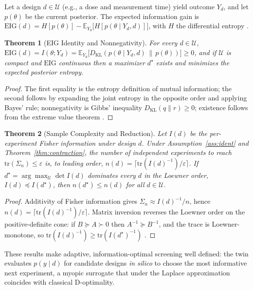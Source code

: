 \documentclass[journal]{IEEEtran}
\newtheorem{theorem}{Theorem}
\newcommand{\E}{\mathbb{E}}
\newcommand{\KL}{D_{\mathrm{KL}}}
\begin{document}
Let a design $d\in\mathcal{U}$ (e.g., a dose and measurement time) yield outcome
$Y_d$, and let $p(\theta)$ be the current posterior. The expected information gain
is $\mathrm{EIG}(d)=H[p(\theta)]-\E_{Y_d}\!\big[H[p(\theta\mid Y_d,d)]\big]$, with
$H$ the differential entropy \cite{cover2006,lindley1956}.

\begin{theorem}[EIG Identity and Nonnegativity]
\label{thm:eig}
For every $d\in\mathcal{U}$,
$\mathrm{EIG}(d)=I(\theta;Y_d)=\E_{Y_d}\big[\KL(p(\theta\mid Y_d,d)\,\|\,p(\theta))\big]\ge0$,
and if $\mathcal{U}$ is compact and $\mathrm{EIG}$ continuous then a maximizer
$d^\star$ exists and minimizes the expected posterior entropy.
\end{theorem}
\begin{proof}
The first equality is the entropy definition of mutual information; the second
follows by expanding the joint entropy in the opposite order and applying Bayes'
rule; nonnegativity is Gibbs' inequality $\KL(q\|r)\ge0$; existence follows from
the extreme value theorem \cite{chaloner1995}.
\end{proof}

\begin{theorem}[Sample Complexity and Reduction]
\label{thm:reduction}
Let $I(d)$ be the per-experiment Fisher information under design $d$. Under
Assumption~\ref{ass:ident} and Theorem~\ref{thm:contraction}, the number of
independent experiments to reach $\mathrm{tr}(\Sigma_n)\le\varepsilon$ is, to
leading order, $n(d)=\lceil\mathrm{tr}(I(d)^{-1})/\varepsilon\rceil$. If
$d^\star=\arg\max_{\mathcal U}\det I(d)$ dominates every $d$ in the Loewner order,
$I(d)\preceq I(d^\star)$, then $n(d^\star)\le n(d)$ for all $d\in\mathcal U$.
\end{theorem}
\begin{proof}
Additivity of Fisher information gives $\Sigma_n\approx I(d)^{-1}/n$, hence
$n(d)=\lceil\mathrm{tr}(I(d)^{-1})/\varepsilon\rceil$. Matrix inversion reverses
the Loewner order on the positive-definite cone: if $B\succeq A\succ0$ then
$A^{-1}\succeq B^{-1}$, and the trace is Loewner-monotone, so
$\mathrm{tr}(I(d)^{-1})\ge\mathrm{tr}(I(d^\star)^{-1})$ \cite{bhatia1997}.
\end{proof}

These results make adaptive, information-optimal screening well defined: the twin
evaluates $p(y\mid d)$ for candidate designs \emph{in silico} to choose the most
informative next experiment, a myopic surrogate that under the Laplace
approximation coincides with classical D-optimality.
\end{document}
